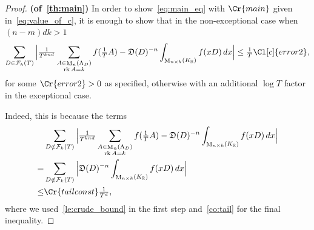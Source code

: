 \documentclass{amsart}
\theoremstyle{definition}
\theoremstyle{remark}
\newcommand{\KR}{K_\mathbb{R}}
\DeclareMathOperator{\M}{M}
\DeclareMathOperator{\rank}{rk}
\begin{document}
\begin{proof} {\bf (of~\cref{th:main})}
    In order to show~\cref{eq:main_eq} with $\Cr{main}$ given in~\cref{eq:value_of_c}, it is enough to show that in the non-exceptional case when $(n-m)dk > 1$
    \begin{equation}
        \sum_{D \in \mathcal{F}_{k}(T)}^{}  \Big|
        \tfrac{1}{T^{knd}}\sum_{\substack{A \in \M_{n}(\Lambda_{D}) \\ \rank A = k}} f( \tfrac{1}{T} A)  - 
        \mathfrak{D}(D)^{-n}\int_{\M_{n \times k}(\KR)} f( x D )\, dx \Big| \leq \tfrac{1}{T}\Cl[c]{error2} ,
        \label{eq:required_eq}
    \end{equation}
    for some $\Cr{error2}>0$ as specified, otherwise with an additional $\log T$ factor in the exceptional case.

    Indeed, this is because the terms
    \begin{align}
    & \sum_{D \notin \mathcal{F}_{k}(T)}^{}  \Big|
    \tfrac{1}{T^{knd}}\sum_{\substack{A \in \M_{n}(\Lambda_{D}) \\ \rank A = k}} f( \tfrac{1}{T} A)  - 
    \mathfrak{D}(D)^{-n}\int_{\M_{n \times k}(\KR)} f( x D )\, dx \Big|    \\
        = & \sum_{D \notin \mathcal{F}_{k}(T)}^{}  \Big| 
        \mathfrak{D}(D)^{-n}\int_{\M_{n \times k}(\KR)} f( x D )\, dx \Big|  \\ 
        \leq & 
        \Cr{tailconst} \tfrac{1}{T^{d}},
        \label{eq:nonrequired_eq}
    \end{align}
    where we used~\cref{le:crude_bound} in the first step
    and~\cref{co:tail} for the final inequality.


\end{proof}
\end{document}
